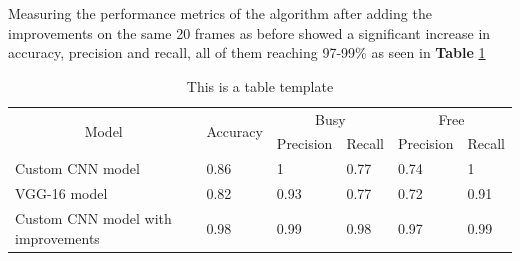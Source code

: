 \documentclass[12pt]{article}
\begin{document}
Measuring the performance metrics of the algorithm after adding the improvements on the same 20 frames as before showed a significant increase in accuracy, precision and recall, all of them reaching 97-99\% as seen in \textbf{Table} \ref{tab:metrics}

\begin{table}[htb]
  \begin{centering}
  \begin{tabular}{|l|l|l|l|l|l|}
  \hline
  \multicolumn{1}{|c|}{\multirow{2}{*}{Model}} & \multirow{2}{*}{Accuracy} & \multicolumn{2}{c|}{Busy} & \multicolumn{2}{c|}{Free} \\ \cline{3-6} 
  \multicolumn{1}{|c|}{}                       &                           & Precision     & Recall    & Precision     & Recall    \\ \hline
  Custom CNN model                             & 0.86                      & 1             & 0.77      & 0.74          & 1         \\ \hline
  VGG-16 model                                 & 0.82                      & 0.93          & 0.77      & 0.72          & 0.91    \\ \hline
  Custom CNN model with improvements           & 0.98                      & 0.99          & 0.98      & 0.97          & 0.99      \\ \hline
  \end{tabular}
  \caption{This is a table template}
  \label{tab:metrics}
  \end{centering}
  \end{table}


\clearpage


\end{document}
